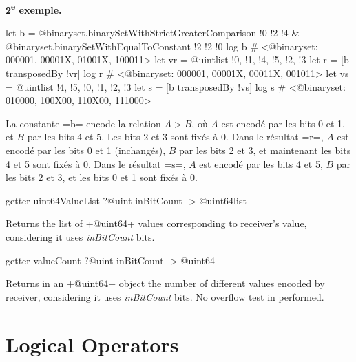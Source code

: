 {\bf 2\textsuperscript{e} exemple.}
\begin{galgas3}
  let b = @binaryset.binarySetWithStrictGreaterComparison {!0 !2 !4}
    & @binaryset.binarySetWithEqualToConstant {!2 !2 !0}
  log b # <@binaryset: 000001, 00001X, 01001X, 100011>
  let vr = @uintlist {!0, !1, !4, !5, !2, !3}
  let r = [b transposedBy !vr]
  log r # <@binaryset: 000001, 00001X, 00011X, 001011>
  let vs = @uintlist {!4, !5, !0, !1, !2, !3}
  let s = [b transposedBy !vs]
  log s # <@binaryset: 010000, 100X00, 110X00, 111000>
\end{galgas3}

La constante \ggst=b= encode la relation $A > B$, où $A$ est encodé par les bits 0 et 1, et $B$ par les bits 4 et 5. Les bits 2 et 3 sont fixés à 0. Dans le résultat \ggst=r=, $A$ est encodé par les bits 0 et 1 (inchangés), $B$ par les bits 2 et 3, et maintenant les bits 4 et 5 sont fixés à 0. Dans le résultat \ggst=s=, $A$ est encodé par les bits 4 et 5, $B$ par les bits 2 et 3, et les bits 0 et 1 sont fixés à 0.













\begin{galgas3box}
getter uint64ValueList ?@uint inBitCount -> @uint64list
\end{galgas3box}


Returns the list of \ggst+@uint64+ values corresponding to receiver's value, considering it uses \emph{inBitCount} bits.









\begin{galgas3box}
getter valueCount ?@uint inBitCount -> @uint64
\end{galgas3box}


Returns in an \ggst+@uint64+ object the number of different values encoded by receiver, considering it uses \emph{inBitCount} bits. No overflow test in performed.








\section{Logical Operators}

